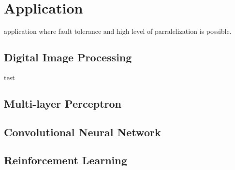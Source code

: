 %
\chapter{Application}
\label{sec:app}


application where fault tolerance and high level of parralelization is possible. 

\section{Digital Image Processing}
\label{sec:app:sec1}

\cite{liUsingStochasticComputing2011} test

\cite{d}

\section{Multi-layer Perceptron}
\label{sec:app:sec2}


\section{Convolutional Neural Network}
\label{sec:app:sec3}



\section{Reinforcement Learning}
\label{sec:app:sec4}


